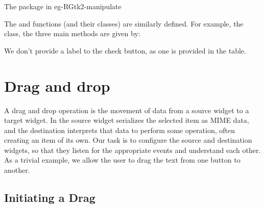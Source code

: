 \begin{example}{The  package in }{eg-RGtk2-manipulate}
%

The  and  functions (and their
classes) are similarly defined. For example, the 
class, the three main methods are given by:
\begin{Schunk}
\end{Schunk}
%
We don't provide a label to the check button, as one is provided in
the table.


\end{example}

\section{Drag and drop}
\label{sec:RGtk2:dnd}


A drag and drop operation is the movement of data from a source widget
to a target widget. In \GTK{} the source widget serializes the
selected item as MIME data, and the destination interprets that data
to perform some operation, often creating an item of its own. Our task
is to configure the source and destination widgets, so that they
listen for the appropriate events and understand each other. As a
trivial example, we allow the user to drag the text from one button to
another.

\subsection{Initiating a Drag}

